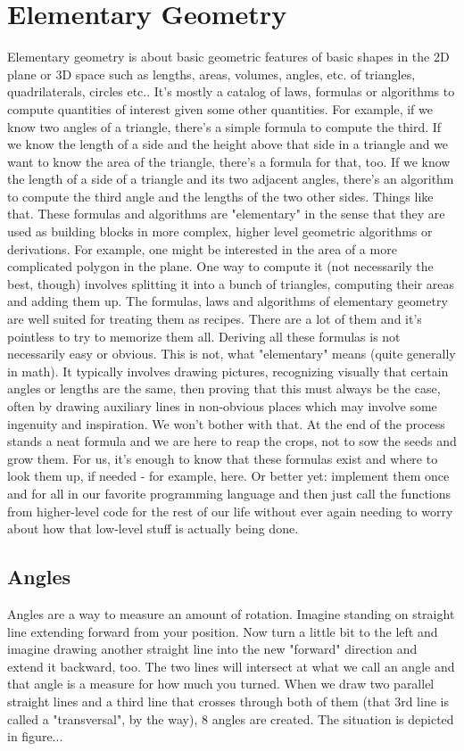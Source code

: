 \section{Elementary Geometry}
Elementary geometry is about basic geometric features of basic shapes in the 2D plane or 3D space such as lengths, areas, volumes, angles, etc. of triangles, quadrilaterals, circles etc.. It's mostly a catalog of laws, formulas or algorithms to compute quantities of interest given some other quantities. For example, if we know two angles of a triangle, there's a simple formula to compute the third. If we know the length of a side and the height above that side in a triangle and we want to know the area of the triangle, there's a formula for that, too. If we know the length of a side of a triangle and its two adjacent angles, there's an algorithm to compute the third angle and the lengths of the two other sides. Things like that. These formulas and algorithms are "elementary" in the sense that they are used as building blocks in more complex, higher level geometric algorithms or derivations. For example, one might be interested in the area of a more complicated polygon in the plane. One way to compute it (not necessarily the best, though) involves splitting it into a bunch of triangles, computing their areas and adding them up. The formulas, laws and algorithms of elementary geometry are well suited for treating them as recipes. There are a lot of them and it's pointless to try to memorize them all. Deriving all these formulas is not necessarily easy or obvious. This is not, what "elementary" means (quite generally in math). It typically involves drawing pictures, recognizing visually that certain angles or lengths are the same, then proving that this must always be the case, often by drawing auxiliary lines in non-obvious places which may involve some ingenuity and inspiration. We won't bother with that. At the end of the process stands a neat formula and we are here to reap the crops, not to sow the seeds and grow them. For us, it's enough to know that these formulas exist and where to look them up, if needed - for example, here. Or better yet: implement them once and for all in our favorite programming language and then just call the functions from higher-level code for the rest of our life without ever again needing to worry about how that low-level stuff is actually being done. 

\subsection{Angles}
Angles are a way to measure an amount of rotation. Imagine standing on straight line extending forward from your position. Now turn a little bit to the left and imagine drawing another straight line into the new "forward" direction and extend it backward, too. The two lines will intersect at what we call an angle and that angle is a measure for how much you turned. When we draw two parallel straight lines and a third line that crosses through both of them (that 3rd line is called a "transversal", by the way), 8 angles are created. The situation is depicted in figure...

